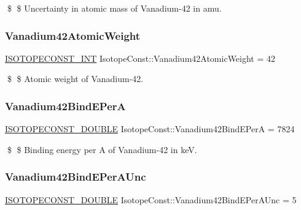 \$ \$ Uncertainty in atomic mass of Vanadium-\/42 in amu. \mbox{\label{group___isotope_const-_vanadium-_v42_gac95afbaf5a3d5f0899fb929a5d490cf7}} 
\subsubsection{\texorpdfstring{Vanadium42\+Atomic\+Weight}{Vanadium42AtomicWeight}}
{\footnotesize\ttfamily \mbox{\hyperlink{group___isotope_const-_macros_ga5f18360b3e99483a35c32d789e62621c}{I\+S\+O\+T\+O\+P\+E\+C\+O\+N\+S\+T\+\_\+\+I\+NT}} Isotope\+Const\+::\+Vanadium42\+Atomic\+Weight = 42}

\$ \$ Atomic weight of Vanadium-\/42. \mbox{\label{group___isotope_const-_vanadium-_v42_ga7f17753bcb0938020a3b6f62deb11647}} 
\subsubsection{\texorpdfstring{Vanadium42\+Bind\+E\+PerA}{Vanadium42BindEPerA}}
{\footnotesize\ttfamily \mbox{\hyperlink{group___isotope_const-_macros_ga8f45a7272ce02c0b4c65c44636ed719a}{I\+S\+O\+T\+O\+P\+E\+C\+O\+N\+S\+T\+\_\+\+D\+O\+U\+B\+LE}} Isotope\+Const\+::\+Vanadium42\+Bind\+E\+PerA = 7824}

\$ \$ Binding energy per A of Vanadium-\/42 in keV. \mbox{\label{group___isotope_const-_vanadium-_v42_ga164b219403972a0a86df3a6ddd9a6df6}} 
\subsubsection{\texorpdfstring{Vanadium42\+Bind\+E\+Per\+A\+Unc}{Vanadium42BindEPerAUnc}}
{\footnotesize\ttfamily \mbox{\hyperlink{group___isotope_const-_macros_ga8f45a7272ce02c0b4c65c44636ed719a}{I\+S\+O\+T\+O\+P\+E\+C\+O\+N\+S\+T\+\_\+\+D\+O\+U\+B\+LE}} Isotope\+Const\+::\+Vanadium42\+Bind\+E\+Per\+A\+Unc = 5}


